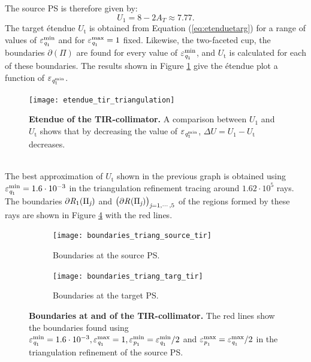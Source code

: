 The source PS is therefore given by:
\begin{equation}
U_1 = 8-2A_T\approx 7.77.
\end{equation}
The target \'{e}tendue $U_{\textrm{t}}$ is obtained from Equation (\ref{eq:etenduetarg}) for a range of values of $\varepsilon_{\textit{q}_1}^{\textrm{min}}$ and for $\varepsilon_{\textit{q}_1}^{\textrm{max}}=1$ fixed. Likewise, the two-faceted cup, the boundaries $\partial$$(\Pi)$ are found for every value of $\varepsilon_{\textit{q}_1}^{\textrm{min}}$, and $U_{\textrm{t}}$ is calculated for each of these boundaries. 
The results shown in Figure \ref{fig:etendue_tir_triangulation} give the \'{e}tendue plot a function of $\varepsilon_{\textit{q}_{1}^{\textrm{min}}}$.
 \begin{figure}[h!]
  \center
  \texttt{[image: etendue\_tir\_triangulation]}
  \caption{\textbf{Etendue of the TIR-collimator.} A comparison between $U_1$ and $U_{\textrm{t}}$ shows that by decreasing the value of $\varepsilon_{\textit{q}_{1}^{\textrm{min}}}$, $\Delta U= U_1-U_{\textrm{t}}$ decreases.}
  \label{fig:etendue_tir_triangulation}
\end{figure}
\\ \indent 
The best approximation of $U_{\textrm{t}}$ shown in the previous graph is obtained using $\varepsilon_{\textit{q}_1}^{\textrm{min}}=1.6\cdot 10^{-3}$ in the triangulation refinement tracing around $1.62 \cdot 10^5$ rays. The boundaries $\partial\mbox{$\emph{R}_{\textit{$1$}}$}(\Pi_{\textit{j}})$ and $\big(\partial\mbox{$\emph{R}_{\textit{}}$}(\Pi_{\textit{j}})\big)_{\textit{j} = 1, \cdots, 5}$ of the regions formed by these rays are shown in Figure \ref{fig:boundaries_TIR_triangulation} with the red lines. 
\begin{figure}[h]
 \begin{subfigure}[t]{0.47\textwidth}
\centering
    \texttt{[image: boundaries\_triang\_source\_tir]}
    \caption{Boundaries at the source PS.}
    \label{fig:boundaries_triang_source_tir}
\end{subfigure}
\hfill
\begin{subfigure}[t]{0.47\textwidth}
\centering
    \texttt{[image: boundaries\_triang\_targ\_tir]}
    \caption{Boundaries at the target PS.}
    \label{fig:boundaries_triang_target_tir}
\end{subfigure}
\caption{\textbf{Boundaries at  and  of the TIR-collimator.} The red lines show the boundaries found using $\varepsilon_{\textit{q}_1}^{\textrm{min}}=1.6\cdot 10^{-3}, \varepsilon_{\textit{q}_1}^{\textrm{max}}=1, \varepsilon_{\textit{p}_1}^{\textrm{min}}=\varepsilon_{\textit{q}_1}^{\textrm{min}}/2$ and $\varepsilon_{\textit{p}_1}^{\textrm{max}} = \varepsilon_{\textit{q}_1}^{\textrm{max}}/2$ in the triangulation refinement of the source PS.}
 \label{fig:boundaries_TIR_triangulation}
\end{figure}
